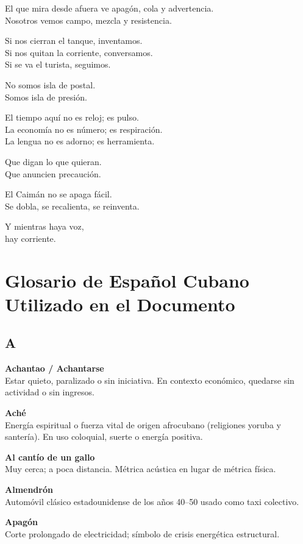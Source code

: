 \documentclass[12pt]{article}
\begin{document}
El que mira desde afuera ve apagón, cola y advertencia.\\
Nosotros vemos campo, mezcla y resistencia.

Si nos cierran el tanque, inventamos.\\
Si nos quitan la corriente, conversamos.\\
Si se va el turista, seguimos.

No somos isla de postal.\\
Somos isla de presión.

El tiempo aquí no es reloj; es pulso.\\
La economía no es número; es respiración.\\
La lengua no es adorno; es herramienta.

Que digan lo que quieran.\\
Que anuncien precaución.

El Caimán no se apaga fácil.\\
Se dobla, se recalienta, se reinventa.

Y mientras haya voz,\\
hay corriente.

\newpage
\appendix
\section{Glosario de Español Cubano Utilizado en el Documento}

\subsection*{A}

\textbf{Achantao / Achantarse}\\
Estar quieto, paralizado o sin iniciativa. En contexto económico, quedarse sin actividad o sin ingresos.

\textbf{Aché}\\
Energía espiritual o fuerza vital de origen afrocubano (religiones yoruba y santería). En uso coloquial, suerte o energía positiva.

\textbf{Al cantío de un gallo}\\
Muy cerca; a poca distancia. Métrica acústica en lugar de métrica física.

\textbf{Almendrón}\\
Automóvil clásico estadounidense de los años 40--50 usado como taxi colectivo.

\textbf{Apagón}\\
Corte prolongado de electricidad; símbolo de crisis energética estructural.
\end{document}
